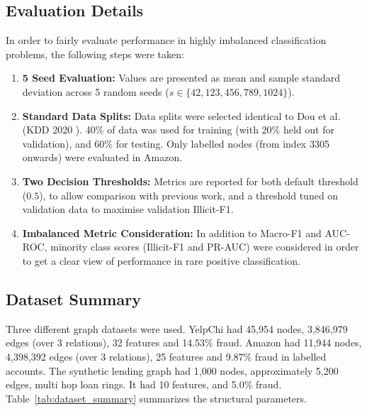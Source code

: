 \subsection{Evaluation Details}

In order to fairly evaluate performance in highly imbalanced classification problems, the following steps were taken:

\begin{enumerate}
    \item \textbf{5 Seed Evaluation:} Values are presented as mean and sample standard deviation across 5 random seeds ($s \in \{42, 123, 456, 789, 1024\}$).
    \item \textbf{Standard Data Splits:} Data splits were selected identical to Dou et al. (KDD 2020 \cite{dou2020enhancing}). 40\% of data was used for training (with 20\% held out for validation), and 60\% for testing. Only labelled nodes (from index 3305 onwards) were evaluated in Amazon.
    \item \textbf{Two Decision Thresholds:} Metrics are reported for both default threshold ($0.5$), to allow comparison with previous work, and a threshold tuned on validation data to maximise validation Illicit-F1.
    \item \textbf{Imbalanced Metric Consideration:} In addition to Macro-F1 and AUC-ROC, minority class scores (Illicit-F1 and PR-AUC) were considered in order to get a clear view of performance in rare positive classification.
\end{enumerate}

\subsection{Dataset Summary}

Three different graph datasets were used. YelpChi had 45,954 nodes, 3,846,979 edges (over 3 relations), 32 features and 14.53\% fraud. Amazon had 11,944 nodes, 4,398,392 edges (over 3 relations), 25 features and 9.87\% fraud in labelled accounts. The synthetic lending graph had 1,000 nodes, approximately 5,200 edges, multi hop loan rings. It had 10 features, and 5.0\% fraud. Table~\ref{tab:dataset_summary} summarizes the structural parameters.

